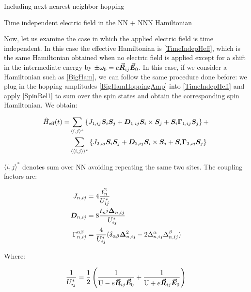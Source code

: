 \begin{section}{Including next nearest neighbor hopping}
\begin{subsection}{Time independent electric field in the NN + NNN Hamiltonian}

Now, let us examine the case in which the applied electric field is time independent. In this case the effective Hamiltonian is \ref{TimeIndepHeff}, which is the same Hamiltonian obtained when no electric field is applied except for a shift in the intermediate energy by $\pm \omega_0 = e\boldsymbol{\vec{R}}_{ij}\boldsymbol{\vec{E}}_0$. In this case, if we consider a Hamiltonian such as \ref{BigHam}, we can follow the same procedure done before: we plug in the hopping amplitudes \ref{BigHamHoppingAmp} into \ref{TimeIndepHeff} and apply \ref{SpinRel1} to sum over the spin states and obtain the corresponding spin Hamiltonian. We obtain:

\begin{align}
\hat{H}_{\text{eff}}(t) = &\sum_{\langle i,j \rangle ^*} \left\{ J_{1,ij}\boldsymbol{S}_i\boldsymbol{S}_j + \boldsymbol{D}_{1,ij} \boldsymbol{S}_i \times \boldsymbol{S}_j + \boldsymbol{S}_i\boldsymbol{\Gamma}_{1,ij}\boldsymbol{S}_j\right\} + \nonumber \\
&\sum_{\langle \langle i,j \rangle \rangle^*} \left\{ J_{2,ij}\boldsymbol{S}_i\boldsymbol{S}_j + \boldsymbol{D}_{2,ij} \boldsymbol{S}_i \times \boldsymbol{S}_j + \boldsymbol{S}_i\boldsymbol{\Gamma}_{2,ij}\boldsymbol{S}_j\right\}
\end{align}

$\langle i,j \rangle ^*$ denotes sum over NN avoiding repeating the same two sites. The coupling factors are:

\begin{align}
J_{n,ij} &= 4\frac{t_n^2}{U^*_{ij}} \\
\boldsymbol{D}_{n,ij} &= 8\frac{t_n i\boldsymbol{\Delta}_{n,ij}}{U^*_{ij}} \\
\Gamma_{n,ij}^{\alpha \beta} &= \frac{4}{U^*_{ij}}(\delta_{\alpha \beta} \boldsymbol{\Delta}_{n,ij}^2 - 2\Delta_{n,ij}^\alpha\Delta_{n,ij}^\beta )
\end{align}

Where:

\begin{equation}
\frac{1}{U^*_{ij}} =  \frac{1}{2}\left( \frac{1}{\text{U} - e\boldsymbol{\vec{R}}_{ij}\boldsymbol{\vec{E}}_0} + \frac{1}{\text{U} + e\boldsymbol{\vec{R}}_{ij}\boldsymbol{\vec{E}}_0} \right)
\end{equation}

\end{subsection}

\end{section}